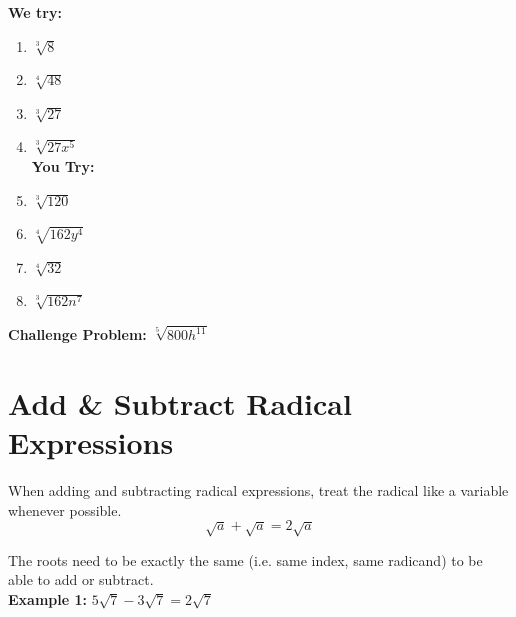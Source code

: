 \documentclass[12pt]{article}
\begin{document}
\begin{multicols}{2}
\textbf{We try:}\\

\begin{enumerate}
	\setlength\itemsep{1cm}

	\item $\sqrt[3]{8}$\\
	
	
	\item $\sqrt[4]{48}$\\
	
	
	\item $\sqrt[3]{27}$\\
	
	
	\item $\sqrt[3]{27x^5}$\\
	
		
\textbf{You Try:}\\
	
	\item  $\sqrt[3]{120}$ \\
	
	
	\item $\sqrt[4]{162y^4}$\\
	
	
	\item $\sqrt[4]{32}$\\
	
	
	\item $\sqrt[3]{162n^7}$\\
	
	

\end{enumerate}
\end{multicols}

 \textbf{Challenge Problem:} $\sqrt[5]{800h^{11}}$

\section*{Add \& Subtract Radical Expressions}

When adding and subtracting radical expressions, treat the radical like a variable whenever possible.\\

$$\sqrt{a} + \sqrt{a} = 2\sqrt{a}$$

The roots need to be exactly the same (i.e. same index, same radicand) to be able to add or subtract.\\

\textbf{Example 1:} $5\sqrt{7} - 3 \sqrt{7} = 2\sqrt{7}$\\
\end{document}
